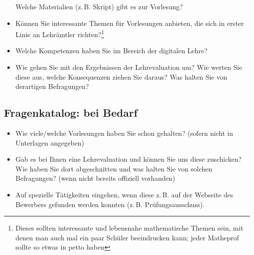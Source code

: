 \begin{itemize}
          Welche Materialien (z.\,B. Skript) gibt es zur Vorlesung?
    \item Können Sie interessante Themen für Vorlesungen anbieten, die sich in erster Linie an Lehrämtler richten?\footnote{%
              Dieses sollten interessante und lebensnahe mathematische Themen sein, mit denen man auch mal ein paar Schüler beeindrucken kann;
              jeder Matheprof sollte so etwas in petto haben}
    \item Welche Kompetenzen haben Sie im Bereich der digitalen Lehre?
    \item Wie gehen Sie mit den Ergebnissen der Lehrevaluation um?
          Wie werten Sie diese aus, welche Konsequenzen ziehen Sie daraus?
          Was halten Sie von derartigen Befragungen?
\end{itemize}

\subsection{Fragenkatalog: bei Bedarf}
\begin{itemize}
    \item Wie viele/welche Vorlesungen haben Sie schon gehalten?
          (sofern nicht in Unterlagen angegeben)
    \item Gab es bei Ihnen eine Lehrevaluation und können Sie uns diese zuschicken?
          Wie haben Sie dort abgeschnitten und was halten Sie von solchen Befragungen? (wenn nicht bereits offiziell vorhanden)
    \item Auf spezielle Tätigkeiten eingehen, wenn diese z.\,B. auf der Webseite des Bewerbers gefunden werden konnten (z.\,B. Prüfungsausschuss).
\end{itemize}

